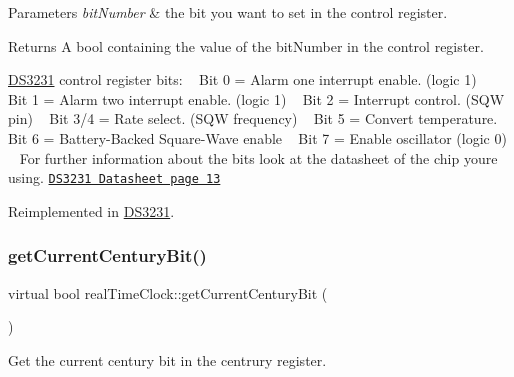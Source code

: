 \begin{DoxyParams}{Parameters}
{\em bit\+Number} & the bit you want to set in the control register. \\
\hline
\end{DoxyParams}
\begin{DoxyReturn}{Returns}
A bool containing the value of the bit\+Number in the control register.
\end{DoxyReturn}
\mbox{\hyperlink{class_d_s3231}{D\+S3231}} control register bits\+: ~\newline
 Bit 0 = Alarm one interrupt enable. (logic 1) ~\newline
 Bit 1 = Alarm two interrupt enable. (logic 1) ~\newline
 Bit 2 = Interrupt control. (S\+QW pin) ~\newline
 Bit 3/4 = Rate select. (S\+QW frequency) ~\newline
 Bit 5 = Convert temperature. ~\newline
 Bit 6 = Battery-\/\+Backed Square-\/\+Wave enable ~\newline
 Bit 7 = Enable oscillator (logic 0) ~\newline
 For further information about the bits look at the datasheet of the chip you\textquotesingle{}re using. \href{https://datasheets.maximintegrated.com/en/ds/DS3231.pdf}{\tt D\+S3231 Datasheet page 13} 

Reimplemented in \mbox{\hyperlink{class_d_s3231_a5b22edafc0d475fd6e33936c286654d5}{D\+S3231}}.

\mbox{\label{classreal_time_clock_ae0b15649f9135be8f0d9ada65084c28f}} 
\subsubsection{\texorpdfstring{get\+Current\+Century\+Bit()}{getCurrentCenturyBit()}}
{\footnotesize\ttfamily virtual bool real\+Time\+Clock\+::get\+Current\+Century\+Bit (\begin{DoxyParamCaption}{ }\end{DoxyParamCaption})\hspace{0.3cm}{\ttfamily [pure virtual]}}



Get the current century bit in the centrury register. 

